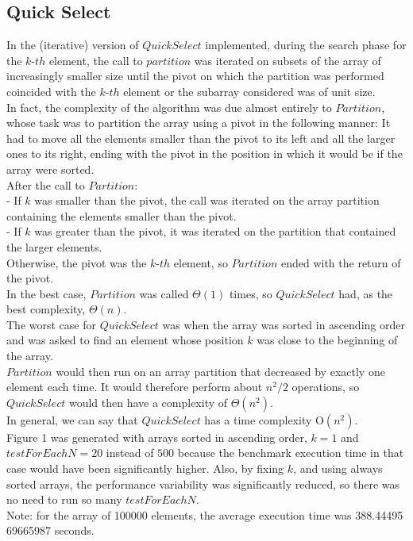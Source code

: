 \documentclass{article}
\begin{document}
\subsection{Quick Select}
In the (iterative) version of $QuickSelect$ implemented, during the search phase for the $k$-$th$ element, the call to $partition$ was iterated on subsets of the array of increasingly smaller size until the pivot on which the partition was performed coincided with the $k$-$th$ element or the subarray considered was of unit size.\\
In fact, the complexity of the algorithm was due almost entirely to $Partition$, whose task was to partition the array using a pivot in the following manner: It had to move all the elements smaller than the pivot to its left and all the larger ones to its right, ending with the pivot in the position in which it would be if the array were sorted.\\
After the call to $Partition$:\\
- If $k$ was smaller than the pivot, the call was iterated on the array partition containing the elements smaller than the pivot.\\
- If $k$ was greater than the pivot, it was iterated on the partition that contained the larger elements.\\
Otherwise, the pivot was the $k$-$th$ element, so $Partition$ ended with the return of the pivot.\\
In the best case, $Partition$ was called $\Theta(1)$ times, so $QuickSelect$ had, as the best complexity, $\Theta(n)$.\\
The worst case for $QuickSelect$ was when the array was sorted in ascending order and was asked to find an element whose position $k$ was close to the beginning of the array.\\$Partition$ would then run on an array partition that decreased by exactly one element each time. It would therefore perform about $n^2/2$ operations, so $QuickSelect$ would then have a complexity of $\Theta(n^2)$. \\ 
In general, we can say that $QuickSelect$ has a time complexity O$(n^2)$. \\
Figure 1 was generated with arrays sorted in ascending order, $k=1$ and $testForEachN = 20$ instead of $500$ because the benchmark execution time in that case would have been significantly higher. Also, by fixing $k$, and using always sorted arrays, the performance variability was significantly reduced, so there was no need to run so many $testForEachN$.\\
Note: for the array of 100000 elements, the average execution time was 388.44495 69665987 seconds.
\end{document}
